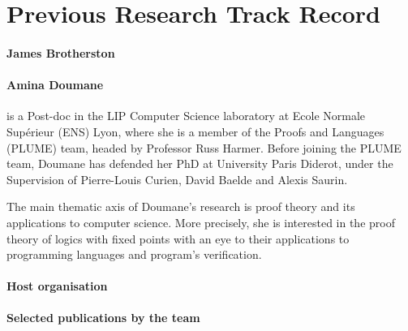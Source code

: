 \section{Previous Research Track Record}

\paragraph{James Brotherston}

\paragraph{Amina Doumane} is a Post-doc in the
LIP Computer Science laboratory at Ecole Normale
Supérieur (ENS) Lyon, where she is a member of the
Proofs and Languages (PLUME) team, headed by Professor
Russ Harmer. Before joining the PLUME team,
Doumane has defended her PhD at University Paris Diderot,
under the Supervision of Pierre-Louis Curien, David
Baelde and Alexis Saurin.

The main thematic axis of Doumane's research is proof theory and its
applications to computer science.  More precisely, she is interested in the proof theory of logics with fixed points with an eye to their applications to programming languages and program's verification. 

\paragraph{Host organisation}

\paragraph{Selected publications by the team}
